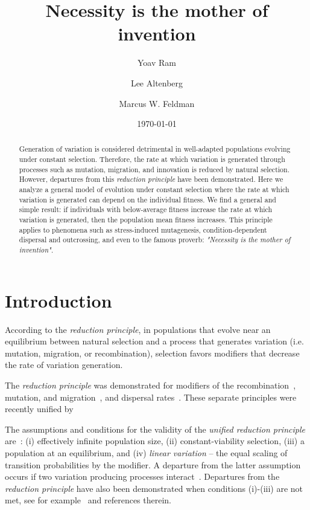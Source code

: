 \documentclass[9pt, a4paper, twocolumn]{extarticle}   	%
\title{Necessity is the mother of invention}
\author[a]{Yoav Ram}
\author[b]{Lee Altenberg}
\author[a]{Marcus W. Feldman}
\affil[a]{Department of Biology, Stanford University, Stanford, CA}
\affil[b]{Information and Computer Sciences, University of Hawai`i at M{\=a}noa, Honolulu, HI}
\date{\today} %
\begin{document}
\maketitle

\begin{abstract}
Generation of variation is considered detrimental in well-adapted
populations evolving under constant selection.
Therefore, the rate at which variation is generated through processes such as mutation,
migration, and innovation is reduced by natural selection.
However, departures from this \emph{reduction principle} have been demonstrated.
Here we analyze a general model of evolution under constant selection where the rate at which variation is generated can depend on the individual fitness.
We find a general and simple result:
if individuals with below-average fitness increase the rate at which variation is generated,
then the population mean fitness increases.
This principle applies to phenomena such as stress-induced mutagenesis,
condition-dependent dispersal and outcrossing,
and even to the famous proverb: \emph{"Necessity is the mother of invention"}.
\end{abstract}

\section*{Introduction}

According to the \emph{reduction principle}, in populations that evolve near an equilibrium between natural selection and a process that generates variation (i.e. mutation, migration, or recombination), selection favors modifiers that decrease the rate of variation generation. 

The \emph{reduction principle} was demonstrated for modifiers of the recombination~\citep{Feldman1972}, mutation, and migration~\citep{Liberman1986a}, and dispersal rates~\citep{Altenberg1987}.
These separate principles were recently unified by~\citet{Altenberg2017}

The assumptions and conditions for the validity of the \emph{unified reduction principle} are~\citep{Altenberg2017}:
(i) effectively infinite population size, (ii) constant-viability selection, (iii) a population at an equilibrium, and (iv) \emph{linear variation} -- the equal scaling of transition probabilities by the modifier.
A departure from the latter assumption occurs if two variation producing processes interact~\citep{Feldman1980,Altenberg2012}.
Departures from the \emph{reduction principle} have also been demonstrated when conditions (i)-(iii) are not met, see for example~\citet{Holsinger1986} and references therein.
\end{document}
